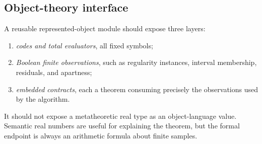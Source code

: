 \subsection{Object-theory interface}

A reusable represented-object module should expose three layers:
\begin{enumerate}[label=\arabic*.]
\item \emph{codes and total evaluators}, all fixed  symbols;
\item \emph{Boolean finite observations}, such as regularity instances, interval membership, residuals, and apartness;
\item \emph{embedded contracts}, each a  theorem consuming precisely the observations used by the algorithm.
\end{enumerate}
It should not expose a metatheoretic real type as an object-language value.  Semantic real numbers are useful for explaining the theorem, but the formal endpoint is always an arithmetic formula about finite samples.
